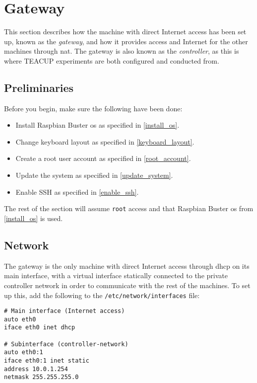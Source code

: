\chapter{Gateway}

This section describes how the machine with direct Internet access has been set up, known as the \textit{gateway}, and how it provides access and Internet for the other machines through \gls{nat}. The gateway is also known as the \textit{controller}, as this is where TEACUP experiments are both configured and conducted from.

\section{Preliminaries}

Before you begin, make sure the following have been done:

\begin{itemize}
    \item Install Raspbian Buster \gls{os} as specified in \ref{install_os}.
    \item Change keyboard layout as specified in \ref{keyboard_layout}.
    \item Create a root user account as specified in \ref{root_account}.
    \item Update the system as specified in \ref{update_system}.
    \item Enable SSH as specified in \ref{enable_ssh}.
\end{itemize}

The rest of the section will assume \lstinline{root} access and that Raspbian Buster \gls{os} from \ref{install_os} is used.


\section{Network}

The gateway is the only machine with direct Internet access through \gls{dhcp} on its main interface, with a virtual interface statically connected to the private controller network in order to communicate with the rest of the machines. To set up this, add the following to the \lstinline{/etc/network/interfaces} file:

\begin{lstlisting}
# Main interface (Internet access)
auto eth0
iface eth0 inet dhcp

# Subinterface (controller-network)
auto eth0:1
iface eth0:1 inet static
address 10.0.1.254
netmask 255.255.255.0
\end{lstlisting}

